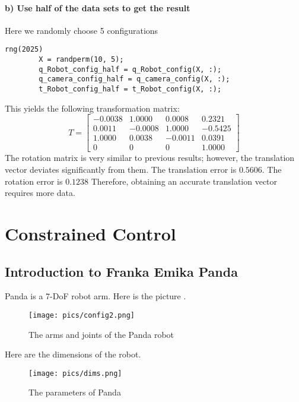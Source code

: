 \documentclass[english,10pt,a4paper]{book}
\begin{document}
    \subsubsection*{b) Use half of the data sets to get the result}
    Here we randomly choose 5 configurations
    \begin{lstlisting}[style=matlab]
    	rng(2025)
    	X = randperm(10, 5);
    	q_Robot_config_half = q_Robot_config(X, :);
    	q_camera_config_half = q_camera_config(X, :);
    	t_Robot_config_half = t_Robot_config(X, :);
    \end{lstlisting}
    This yields the following transformation matrix:
    \begin{equation}
    	T = \begin{bmatrix}
    		-0.0038 & 1.0000 & 0.0008 & 0.2321\\
    		0.0011 & -0.0008 & 1.0000 & -0.5425\\
    		1.0000 & 0.0038 & -0.0011 & 0.0391\\
    		0 & 0 & 0 & 1.0000
    	\end{bmatrix}
    \end{equation}
    The rotation matrix is very similar to previous results; however, the translation vector deviates significantly from them. The translation error is \(0.5606\). The rotation error is \(0.1238\) Therefore, obtaining an accurate translation vector requires more data.
    
    \chapter{Constrained Control}
  		\section{Introduction to Franka Emika Panda}
		Panda is a 7-DoF robot arm. Here is the picture \cite{franka_emika_2017}.
		\begin{figure}[H]
			\texttt{[image: pics/config2.png]}
			\caption{The arms and joints of the Panda robot}
		\end{figure}
		
		Here are the dimensions of the robot.
		\begin{figure}[H]
			\begin{center}
				\texttt{[image: pics/dims.png]}
			\end{center}
			\caption{The parameters of Panda}
		\end{figure}
		
\end{document}
